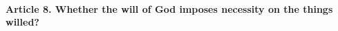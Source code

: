 \documentclass{ucetd}
\begin{document}
\paragraph{Article 8. Whether the will of God imposes necessity on the things willed?}
\end{document}

